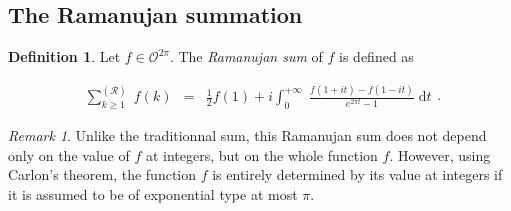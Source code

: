 \documentclass{jams-l}
\theoremstyle{definition}
\newtheorem{definition}[theorem]{Definition}
\theoremstyle{remark}
\newtheorem{remark}[theorem]{Remark}
\numberwithin{equation}{section}
\begin{document}
        
    \subsection{The Ramanujan summation}
    
        \begin{definition}
        
            Let $f \in \mathcal{O}^{2 \pi}$. The \textit{Ramanujan sum} of $f$ is defined as
            
            \[ \begin{array}{lll}
                    \sum\limits_{k \geqslant 1}^{\left( \mathcal{R} \right)} \; f \left( k \right) & = & \frac{1}{2} f \left( 1 \right) + i \int_0^{+ \infty} \; \frac{f \left( 1 + it \right) - f \left( 1 - it \right)}{e^{2 \pi t} - 1} \; \mathrm{d}t
                \end{array} . \]
        
        \end{definition}
        
        \begin{remark}
        
            Unlike the traditionnal sum, this Ramanujan sum does not depend only on the value of $f$ at integers, but on the whole function $f$. However, using Carlon's theorem, the function $f$ is entirely determined by its value at integers if it is assumed to be of exponential type at most $\pi$.
        
        \end{remark}
    
\end{document}
